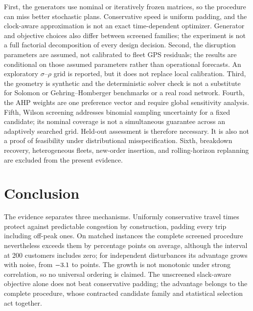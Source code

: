 \documentclass[11pt,a4paper]{article}
\begin{document}
First, the generators use nominal or iteratively frozen matrices, so the
procedure can miss better stochastic plans. Conservative speed is uniform
padding, and the clock-aware approximation is not an exact time-dependent
optimizer. Generator and objective choices also differ between screened
families; the experiment is not a full factorial decomposition of every design
decision. Second, the disruption
parameters are assumed, not calibrated to fleet GPS residuals; the results are
conditional on those assumed parameters rather than operational forecasts. An
exploratory $\sigma$--$\rho$ grid is reported, but it does not replace local
calibration. Third,
the geometry is synthetic and the deterministic solver check is not a
substitute for Solomon or Gehring--Homberger benchmarks or a real road network.
Fourth, the AHP weights are one preference vector and require global
sensitivity analysis. Fifth,
Wilson screening addresses binomial sampling uncertainty for a fixed candidate;
its nominal coverage is not a simultaneous guarantee across an adaptively
searched grid. Held-out assessment is therefore necessary. It is also not a
proof of feasibility under distributional misspecification.
Sixth, breakdown recovery, heterogeneous fleets, new-order insertion, and
rolling-horizon replanning are excluded from the present evidence.

\section{Conclusion}

The evidence separates three mechanisms. Uniformly conservative travel times
protect against predictable congestion by construction, padding every trip
including off-peak ones. On matched instances the complete screened procedure
nevertheless exceeds them by \ProcConsRange{} percentage points on average,
although the interval at 200 customers includes zero; for
independent disturbances its advantage grows with noise, from
$-3.1$ to \SweepHighIndep{} points. The growth is not monotonic
under strong correlation, so no universal ordering is claimed. The unscreened
slack-aware objective alone does not beat conservative padding; the advantage
belongs to the complete procedure, whose contracted candidate family and
statistical selection act together.
\end{document}
